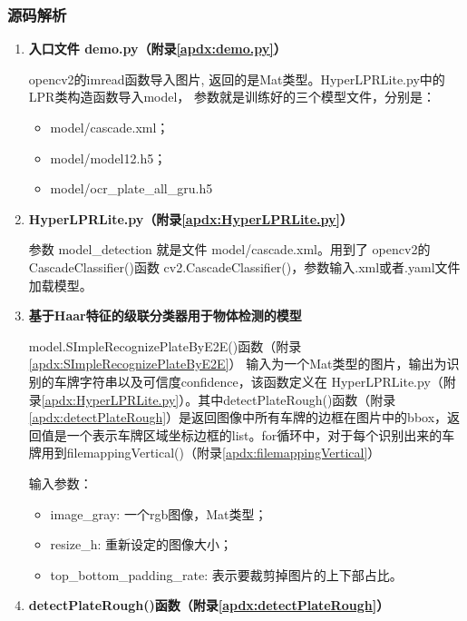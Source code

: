 \subsubsection{源码解析}
\begin{enumerate}[label=\arabic*、]
	\item {\bf 入口文件 demo.py（附录\ref{apdx:demo.py}）}

	      opencv2的imread函数导入图片, 返回的是Mat类型。HyperLPRLite.py中的LPR类构造函数导入model， 参数就是训练好的三个模型文件，分别是：
	      \begin{itemize}
		      \item model/cascade.xml；
		      \item model/model12.h5；
		      \item model/ocr\_plate\_all\_gru.h5
	      \end{itemize}

	\item {\bf HyperLPRLite.py（附录\ref{apdx:HyperLPRLite.py}）}
	
	      参数 model\_detection 就是文件 model/cascade.xml。用到了 opencv2的CascadeClassifier()函数 cv2.CascadeClassifier()，参数输入.xml或者.yaml文件加载模型。

	\item {\bf 基于Haar特征的级联分类器用于物体检测的模型}
	
	      model.SImpleRecognizePlateByE2E()函数（附录\ref{apdx:SImpleRecognizePlateByE2E}）
		  输入为一个Mat类型的图片，输出为识别的车牌字符串以及可信度confidence，该函数定义在 HyperLPRLite.py（附录\ref{apdx:HyperLPRLite.py}）。其中detectPlateRough()函数（附录\ref{apdx:detectPlateRough}）是返回图像中所有车牌的边框在图片中的bbox，返回值是一个表示车牌区域坐标边框的list。for循环中，对于每个识别出来的车牌用到filemappingVertical()（附录\ref{apdx:filemappingVertical}）
		  
	      输入参数：
	      \begin{itemize}
		      \item image\_gray: 一个rgb图像，Mat类型；
		      \item resize\_h: 重新设定的图像大小；
		      \item top\_bottom\_padding\_rate: 表示要裁剪掉图片的上下部占比。
	      \end{itemize}

	\item {\bf detectPlateRough()函数（附录\ref{apdx:detectPlateRough}）}
	

\end{enumerate}

